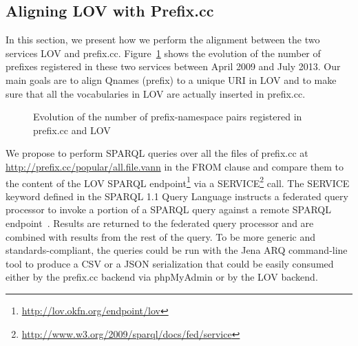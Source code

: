 \begin{description}
\subsection{Aligning LOV with Prefix.cc} \label{sec:alignment}
In this section, we present how we perform the alignment between the two services LOV and prefix.cc. Figure~\ref{fig:evolution} shows the evolution of the number of prefixes registered in these two services between April 2009 and July 2013. Our main goals are to align Qnames (prefix) to a unique URI in LOV and to make sure that all the vocabularies in LOV are actually inserted in prefix.cc.

\begin{figure}[ht]
\centering
\resizebox{\textwidth}{!}{

}
\vspace{0.1cm}
\caption{Evolution of the number of prefix-namespace pairs registered in prefix.cc and LOV}
\label{fig:evolution}
\end{figure}

We propose to perform SPARQL queries over all the files of prefix.cc at\\
 \url{http://prefix.cc/popular/all.file.vann} in the FROM clause and compare them to the content of the LOV SPARQL endpoint\footnote{\url{http://lov.okfn.org/endpoint/lov}} via a SERVICE\footnote{\url{http://www.w3.org/2009/sparql/docs/fed/service}} call. The SERVICE keyword defined in the SPARQL 1.1 Query Language instructs a federated query processor to invoke a portion of a SPARQL query against a remote SPARQL endpoint~\cite{eric2013}. Results are returned to the federated query processor and are combined with results from the rest of the query. To be more generic and standards-compliant, the queries could be run with the Jena ARQ command-line tool to produce a CSV or a JSON serialization that could be easily consumed either by the prefix.cc backend via phpMyAdmin or by the LOV backend.


\end{description}
